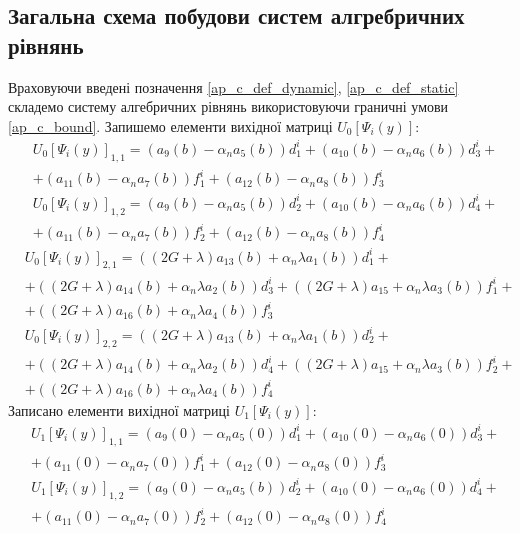 \subsection*{Загальна схема побудови систем алгребричних рівнянь}
Враховуючи введені позначення \eqref{ap_c_def_dynamic}, \eqref{ap_c_def_static} складемо систему алгебричних рівнянь використовуючи граничні умови \eqref{ap_c_bound}.
Запишемо елементи вихідної матриці $U_0\left[ \Psi_i(y) \right]$:
\begin{align*}
    &U_0\left[ \Psi_i(y) \right]_{1,1} = (a_9(b) - \alpha_n a_5(b)) d_1^i + (a_{10}(b) - \alpha_n a_6(b)) d_3^i + \\
    &+ (a_{11}(b) - \alpha_n a_7(b)) f_1^i + (a_{12}(b) - \alpha_n a_8(b)) f_3^i 
\end{align*}
\begin{align*}
    &U_0\left[ \Psi_i(y) \right]_{1,2} = (a_9(b) - \alpha_n a_5(b)) d_2^i + (a_{10}(b) - \alpha_n a_6(b)) d_4^i + \\
    &+ (a_{11}(b) - \alpha_n a_7(b)) f_2^i + (a_{12}(b) - \alpha_n a_8(b)) f_4^i 
\end{align*}
\begin{align*}
    &U_0\left[ \Psi_i(y) \right]_{2,1} = ((2G + \lambda) a_{13}(b) + \alpha_n \lambda a_1(b)) d_1^i + \\ 
    &+ ((2G + \lambda) a_{14}(b) + \alpha_n \lambda a_2(b)) d_3^i + ((2G + \lambda)a_{15} + \alpha_n \lambda a_3(b)) f_1^i + \\ 
    &+ ((2G + \lambda)a_{16}(b) + \alpha_n \lambda a_4(b)) f_3^i 
\end{align*}
\begin{align*}
    &U_0\left[ \Psi_i(y) \right]_{2,2} = ((2G + \lambda) a_{13}(b) + \alpha_n \lambda a_1(b)) d_2^i + \\
    &+ ((2G + \lambda) a_{14}(b) + \alpha_n \lambda a_2(b)) d_4^i + ((2G + \lambda)a_{15} + \alpha_n \lambda a_3(b)) f_2^i + \\
    &+ ((2G + \lambda)a_{16}(b) + \alpha_n \lambda a_4(b)) f_4^i 
\end{align*}
Записано елементи вихідної матриці $U_1\left[ \Psi_i(y) \right]$:
\begin{align*}
    &U_1\left[ \Psi_i(y) \right]_{1,1} = (a_9(0) - \alpha_n a_5(0)) d_1^i + (a_{10}(0) - \alpha_n a_6(0)) d_3^i + \\
    &+ (a_{11}(0) - \alpha_n a_7(0)) f_1^i + (a_{12}(0) - \alpha_n a_8(0)) f_3^i 
\end{align*}
\begin{align*}
    &U_1\left[ \Psi_i(y) \right]_{1,2} = (a_9(0) - \alpha_n a_5(b)) d_2^i + (a_{10}(0) - \alpha_n a_6(0)) d_4^i + \\
    &+ (a_{11}(0) - \alpha_n a_7(0)) f_2^i + (a_{12}(0) - \alpha_n a_8(0)) f_4^i 
\end{align*}
